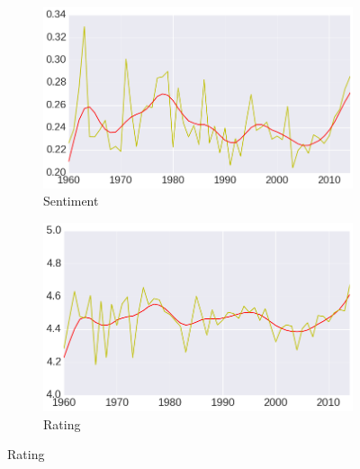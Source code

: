 \begin{figure}
\centering
   \begin{subfigure}{.49\textwidth}
        \centering
        \includegraphics[width=\textwidth]{ch05_musicology_pics/sentiment_release_trend.png}
        \caption{Sentiment}
        \label{fig:musicology:avgSentimentRelease}
    \end{subfigure}
    \begin{subfigure}{.49\textwidth}
        \centering
        \includegraphics[width=\textwidth]{ch05_musicology_pics/rating_release_trend.png}
        \caption{Rating}
        \label{fig:musicology:avgRatingRelease}
    \end{subfigure}
    

\end{figure}
